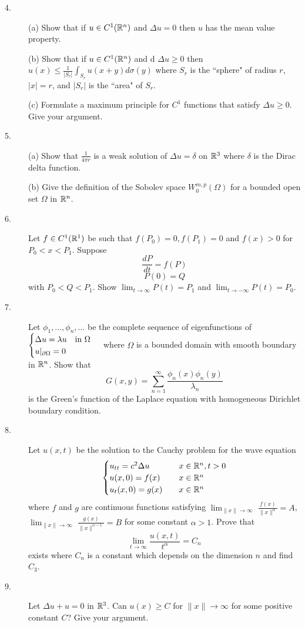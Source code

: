 \documentclass{article}
\begin{document}
\begin{description}
\item[4.] (a)
Show that if $u \in C^1 (\Bbb R^n)$ and $\Delta u = 0$ then $u$ has the mean
value property.

\item[\quad] (b)
Show that if $u \in C^1 (\Bbb R^n)$ and d $\Delta u \geq 0$ then
$u(x) \leq \frac{1}{|S_r|} \int_{S_r} u (x+y) d \sigma (y)$ where
$S_r$ is the ``sphere" of radius $r$, $|x| = r$, and $|S_r|$ is the ``area"
of $S_r$.

\item[\quad] (c)
Formulate a maximum principle for $C^1$ functions that satisfy
$\Delta u \geq 0$. Give your argument.

\item[5.] (a)
Show that $\frac{1}{4 \pi r}$ is a weak solution of $\Delta u =\delta$
on $\Bbb R^3$ where $\delta$ is the Dirac delta function.

\item[\quad] (b)
Give the definition of the Sobolev space $W^{m,p}_0 (\Omega)$ for a bounded
open set $\Omega$ in $\Bbb R^n$.


\item[6.]
Let $f \in C^1(\Bbb R^1)$ be such that $f(P_0) = 0, f(P_1) = 0$ and
$f(x) > 0$ for $P_0 < x < P_1$. Suppose
$$\frac{dP}{dt} = f(P)$$
$$P(0) = Q$$
with $P_0 < Q < P_1$. Show $\lim_{t \to \infty} P(t) = P_1$ and
$\lim_{t \to -\infty} P(t) = P_0$.

\item[7.]
Let $\phi_1, \dots, \phi_n, \dots$ be the complete sequence of eigenfunctions
of
$\begin{cases} \Delta u = \lambda u \quad \hbox{in\ } \Omega \\
   u|_{\partial \Omega} =0 \end{cases} $
where $\Omega$ is a bounded domain with smooth boundary in $\Bbb R^n$. Show
that
$$G(x,y) = \sum^\infty_{n=1} \frac{\phi_n (x) \phi_n (y)}{\lambda_n}$$
is the Green's function of the Laplace equation with homogeneous Dirichlet
boundary condition.

\item[8.]
Let $u(x,t)$ be the solution to the Cauchy problem for the wave equation
$$\begin{cases}
        u_{tt} = c^2 \Delta u \quad &x \in \Bbb R^n, t >0 \\
        u(x,0) = f(x) \quad &x \in \Bbb R^n \\
        u_t(x,0) = g(x) \quad &x \in \Bbb R^n
        \end{cases}$$
where $f$ and $g$ are continuous functions satisfying
$\lim_{\parallel x \parallel \to \infty}$
$\frac{f(x)}{\parallel x \parallel^\alpha} = A$,
$\lim_{\parallel x \parallel \to \infty}$
$\frac{g(x)}{\parallel x \parallel^{\alpha - 1}} = B$
for some constant $\alpha > 1$. Prove that
$$\lim_{t \to \infty} \frac{u(x,t)}{t^\alpha} = C_n$$
exists where $C_n$ is a constant which depends on the dimension $n$ and
find $C_3$.

\item[9.]
Let $\Delta u + u = 0$ in $\Bbb R^3$. Can $u(x) \geq C$ for
$\parallel x \parallel \to \infty$ for some positive constant $C$? Give
your argument.




\end{description}    
\end{document}
